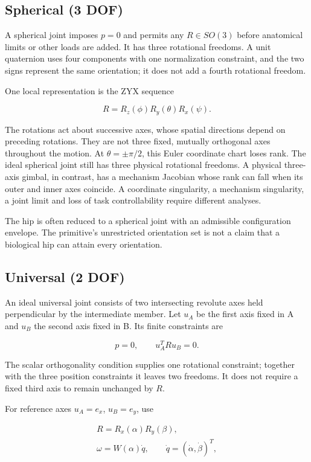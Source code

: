 \subsection{Spherical (3 DOF)}\label{spherical-3-dof}

A spherical joint imposes \(p=0\) and permits any \(R\in SO(3)\) before anatomical limits or other loads are added. It has three rotational freedoms. A unit quaternion uses four components with one normalization constraint, and the two signs represent the same orientation; it does not add a fourth rotational freedom.

One local representation is the ZYX sequence

\[
R=R_z(\phi)R_y(\theta)R_x(\psi).
\]

The rotations act about successive axes, whose spatial directions depend on preceding rotations. They are not three fixed, mutually orthogonal axes throughout the motion. At \(\theta=\pm\pi/2\), this Euler coordinate chart loses rank. The ideal spherical joint still has three physical rotational freedoms. A physical three-axis gimbal, in contrast, has a mechanism Jacobian whose rank can fall when its outer and inner axes coincide. A coordinate singularity, a mechanism singularity, a joint limit and loss of task controllability require different analyses.

The hip is often reduced to a spherical joint with an admissible configuration envelope. The primitive's unrestricted orientation set is not a claim that a biological hip can attain every orientation.

\subsection{Universal (2 DOF)}\label{universal-2-dof}

An ideal universal joint consists of two intersecting revolute axes held perpendicular by the intermediate member. Let \(u_A\) be the first axis fixed in A and \(u_B\) the second axis fixed in B. Its finite constraints are

\[
p=0,\qquad u_A^T R u_B=0.
\]

The scalar orthogonality condition supplies one rotational constraint; together with the three position constraints it leaves two freedoms. It does not require a fixed third axis to remain unchanged by \(R\).

For reference axes \(u_A=e_x\), \(u_B=e_y\), use

\[
\begin{gathered}R=R_x(\alpha)R_y(\beta),\\ \omega=W(\alpha)\dot q,\qquad \dot q=(\dot\alpha,\dot\beta)^T,\end{gathered}
\]

